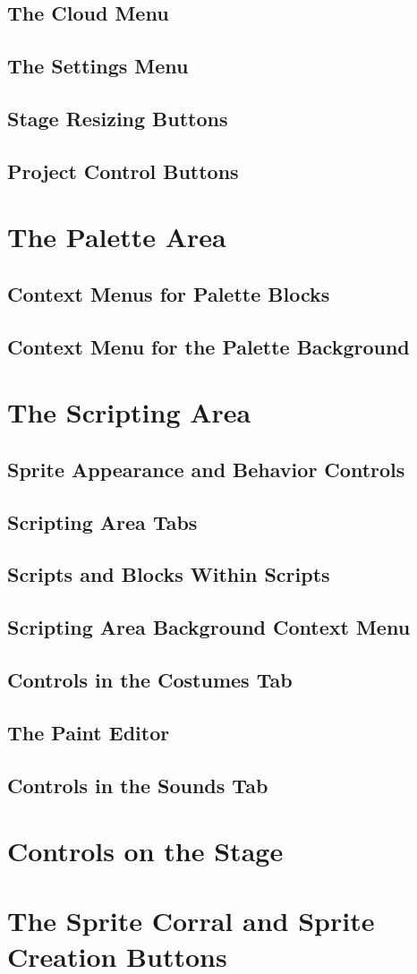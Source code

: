 \documentclass{report}
\begin{document}
\subsection{The Cloud Menu}
\subsection{The Settings Menu}
\subsection{Stage Resizing Buttons}
\subsection{Project Control Buttons}
\section{The Palette Area}
\subsection{Context Menus for Palette Blocks}
\subsection{Context Menu for the Palette Background}
\section{The Scripting Area}
\subsection{Sprite Appearance and Behavior Controls}
\subsection{Scripting Area Tabs}
\subsection{Scripts and Blocks Within Scripts}
\subsection{Scripting Area Background Context Menu}
\subsection{Controls in the Costumes Tab}
\subsection{The Paint Editor}
\subsection{Controls in the Sounds Tab}
\section{Controls on the Stage}
\section{The Sprite Corral and Sprite Creation Buttons}
\end{document}
